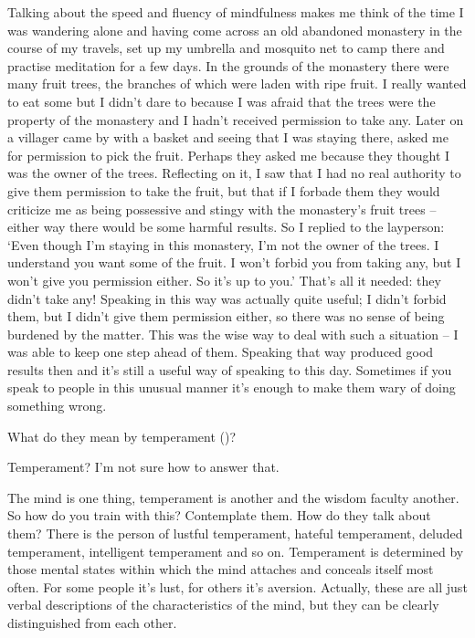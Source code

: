 Talking about the speed and fluency of mindfulness makes me think of the time I was wandering alone and having come across an old abandoned monastery in the course of my travels, set up my umbrella and mosquito net to camp there and practise meditation for a few days. In the grounds of the monastery there were many fruit trees, the branches of which were laden with ripe fruit. I really wanted to eat some but I didn't dare to because I was afraid that the trees were the property of the monastery and I hadn't received permission to take any. Later on a villager came by with a basket and seeing that I was staying there, asked me for permission to pick the fruit. Perhaps they asked me because they thought I was the owner of the trees. Reflecting on it, I saw that I had no real authority to give them permission to take the fruit, but that if I forbade them they would criticize me as being possessive and stingy with the monastery's fruit trees -- either way there would be some harmful results. So I replied to the layperson: `Even though I'm staying in this monastery, I'm not the owner of the trees. I understand you want some of the fruit. I won't forbid you from taking any, but I won't give you permission either. So it's up to you.' That's all it needed: they didn't take any! Speaking in this way was actually quite useful; I didn't forbid them, but I didn't give them permission either, so there was no sense of being burdened by the matter. This was the wise way to deal with such a situation -- I was able to keep one step ahead of them. Speaking that way produced good results then and it's still a useful way of speaking to this day. Sometimes if you speak to people in this unusual manner it's enough to make them wary of doing something wrong. 

What do they mean by temperament ()?

 Temperament? I'm not sure how to answer that.

 The mind is one thing, temperament is another and the wisdom faculty another. So how do you train with this? Contemplate them. How do they talk about them? There is the person of lustful temperament, hateful temperament, deluded temperament, intelligent temperament and so on. Temperament is determined by those mental states within which the mind attaches and conceals itself most often. For some people it's lust, for others it's aversion. Actually, these are all just verbal descriptions of the characteristics of the mind, but they can be clearly distinguished from each other. 


